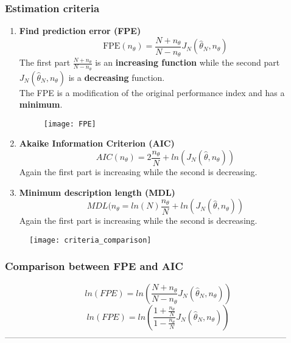 \subsubsection{Estimation criteria}
\begin{enumerate}
\item \textbf{Find prediction error (FPE)}\\
\[
\boxed{\text{FPE}(n_{\theta})= \frac{N+n_{\theta}}{N-n_{\theta}} J_N(\hat{\theta}_N,n_{\theta})}
\]
The first part $\frac{N+n_{\theta}}{N-n_{\theta}}$ is an \textbf{increasing function } while the second part $J_N(\hat{\theta}_N,n_{\theta})$ is a \textbf{decreasing} function.\\
The FPE is a modification of the original performance index and has a \textbf{minimum}.
\begin{figure}[H]
 \centering
  \texttt{[image: FPE]}
\end{figure}
\item \textbf{Akaike Information Criterion (AIC)}\\
\[
\boxed{AIC(n_\theta) = 2 \frac{n_{\theta}}{N}+ ln(J_N(\hat{\theta},n_{\theta}))}
\]
Again the first part is increasing while the second is decreasing.
\item \textbf{Minimum description length (MDL)}\\
\[
\boxed{MDL(n_{\theta}=ln(N)\frac{n_{\theta}}{N}+ln(J_N(\hat{\theta},n_{\theta}))}
\]
Again the first part is increasing while the second is decreasing.
\end{enumerate}
\begin{figure}[H]
 \centering
  \texttt{[image: criteria\_comparison]}
\end{figure}


\subsubsection{Comparison between FPE and AIC}
$$ ln(FPE) = ln(\frac{N+n_{\theta}}{N-n_{\theta}} J_N(\hat{\theta}_N,n_{\theta}))$$
$$ ln(FPE) = ln(\frac{1+\frac{n_{\theta}}{N}}{1-\frac{n_{\theta}}{N}} J_N(\hat{\theta}_N,n_{\theta}))$$
\newpage
---------------------------------------------------------------------------------------------------

